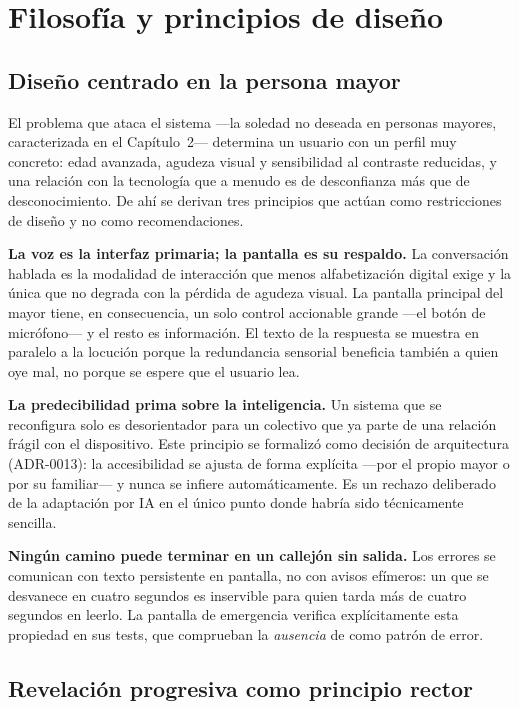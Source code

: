 
\section{Filosofía y principios de diseño}

\subsection{Diseño centrado en la persona mayor}

El problema que ataca el sistema ---la soledad no deseada en personas mayores, caracterizada en el
Capítulo~2--- determina un usuario con un perfil muy concreto: edad avanzada, agudeza visual y sensibilidad
al contraste reducidas, y una relación con la tecnología que a menudo es de desconfianza más que de
desconocimiento. De ahí se derivan tres principios que actúan como restricciones de diseño y no como
recomendaciones.

\textbf{La voz es la interfaz primaria; la pantalla es su respaldo.} La conversación hablada es la
modalidad de interacción que menos alfabetización digital exige y la única que no degrada con la pérdida
de agudeza visual. La pantalla principal del mayor tiene, en consecuencia, un solo control accionable
grande ---el botón de micrófono--- y el resto es información. El texto de la respuesta se muestra en
paralelo a la locución porque la redundancia sensorial beneficia también a quien oye mal, no porque se
espere que el usuario lea.

\textbf{La predecibilidad prima sobre la inteligencia.} Un sistema que se reconfigura solo es
desorientador para un colectivo que ya parte de una relación frágil con el dispositivo. Este principio se
formalizó como decisión de arquitectura (ADR-0013): la accesibilidad se ajusta de forma explícita ---por el
propio mayor o por su familiar--- y nunca se infiere automáticamente. Es un rechazo deliberado de la
adaptación por IA en el único punto donde habría sido técnicamente sencilla.

\textbf{Ningún camino puede terminar en un callejón sin salida.} Los errores se comunican con texto
persistente en pantalla, no con avisos efímeros: un  que se desvanece en cuatro segundos es
inservible para quien tarda más de cuatro segundos en leerlo. La pantalla de emergencia verifica
explícitamente esta propiedad en sus tests, que comprueban la \emph{ausencia} de  como
patrón de error.

\subsection{Revelación progresiva como principio rector}

